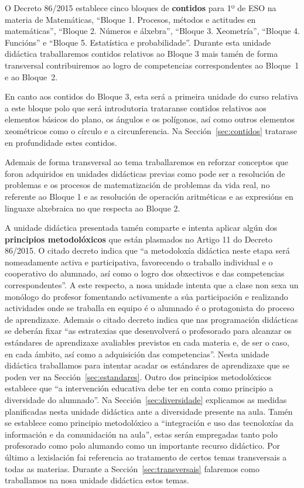 O Decreto 86/2015 establece cinco bloques de \textbf{contidos} para 1º de ESO na materia de Matemáticas, ``Bloque 1. Procesos, métodos e actitudes en matemáticas'', ``Bloque 2. Números e álxebra'', ``Bloque 3. Xeometría'', ``Bloque 4. Funcións'' e ``Bloque 5. Estatística e probabilidade''. Durante esta unidade didáctica traballaremos contidos relativos ao Bloque 3 mais tamén de forma transversal contribuiremos ao logro de competencias correspondentes ao Bloque~1 e ao Bloque~2.

En canto aos contidos do Bloque 3, esta será a primeira unidade do curso relativa a este bloque polo que será introdutoria trataranse contidos relativos aos elementos básicos do plano, os ángulos e os polígonos, así como outros elementos xeométricos como o círculo e a circunferencia. Na Sección~\ref{sec:contidos} tratarase en profundidade estes contidos.

Ademais de forma transversal ao tema traballaremos en reforzar conceptos que foron adquiridos en unidades didácticas previas como pode ser a resolución de problemas e os procesos de matematización de problemas da vida real, no referente ao Bloque 1 e as resolución de operación aritméticas e  as expresións en linguaxe alxebraica no que respecta ao Bloque 2.

A unidade didáctica presentada tamén comparte e intenta aplicar algún dos \textbf{principios metodolóxicos} que están plasmados no Artigo 11 do Decreto 86/2015. O citado decreto indica que ``a metodoloxía didáctica neste etapa será nomeadamente activa e participativa, favorecendo o traballo individual e o cooperativo do alumnado, así como o logro dos obxectivos e das competencias correspondentes''. A este respecto, a nosa unidade intenta que a clase non sexa un monólogo do profesor fomentando activamente a súa participación e realizando actividades onde se traballa en equipo é o alumnado é o protagonista do proceso de aprendizaxe. Ademais o citado decreto indica que nas programación didácticas se deberán fixar ``as estratexias que desenvolverá o profesorado para alcanzar os estándares de aprendizaxe avaliables previstos en cada materia e, de ser o caso, en cada ámbito, así como a adquisición das competencias''. Nesta unidade didáctica traballamos para intentar acadar os estándares de aprendizaxe que se poden ver na Sección~\ref{sec:estandares}. Outro dos principios metodolóxicos establece que ``a intervención educativa debe ter en conta como principio a diversidade do alumnado''. Na Sección~\ref{sec:diversidade} explicamos as medidas planificadas nesta unidade didáctica ante a diversidade presente na aula. Tamén se establece como principio metodolóxico a ``integración e uso das tecnoloxías da información e da comunidación na aula'', estas serán empregadas tanto polo profesorado como polo alumando como un importante recurso didáctico. Por último a lexislación fai referencia ao tratamento de certos temas transversais a todas as materias. Durante a Sección~\ref{sec:transversais} falaremos como traballamos na nosa unidade didáctica estos temas.

